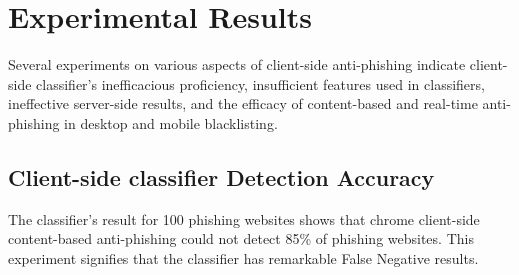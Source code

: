 
\section{Experimental Results}
\label{s:evaluation}

Several experiments on various aspects of client-side anti-phishing indicate client-side classifier's inefficacious proficiency, insufficient features used in classifiers, ineffective server-side results, and the efficacy of content-based and real-time anti-phishing in desktop and mobile blacklisting.

\subsection{ Client-side classifier Detection Accuracy }
The classifier's result for 100 phishing websites shows that chrome client-side content-based anti-phishing could not detect 85\%  of phishing websites. This experiment signifies that the classifier has remarkable False Negative results. 
\begin{table}[]
\caption{Client-side and server-side detection ratio}
\label{tab: Client -side and server-side}
\end{table}

